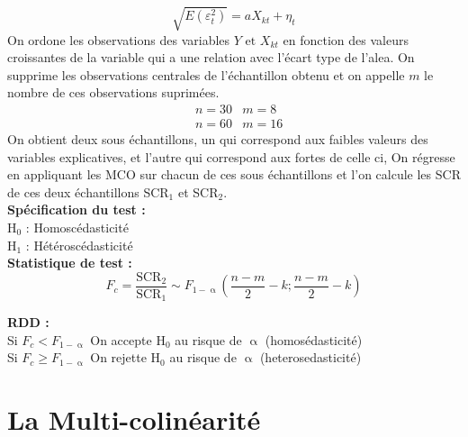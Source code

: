 \documentclass{article}
\begin{document}
\begin{equation*}
    \sqrt{E(\varepsilon_t^2)} = a X_{kt} + \eta_t
\end{equation*}
On ordone les observations des variables $Y \text{ et } X_{kt}$ en fonction des valeurs croissantes de la
variable qui a une relation avec l'écart type de l'alea. On supprime les observations
centrales de l'échantillon obtenu et on appelle $m$ le nombre de ces observations suprimées.
\begin{align*}
    &n =30  &m=8 \\
    &n =60  &m=16
\end{align*}
On obtient deux sous échantillons, un qui correspond aux faibles valeurs des variables
explicatives, et l'autre qui correspond aux fortes de celle ci, On régresse en appliquant les MCO sur chacun
de ces sous échantillons et l'on calcule les SCR de ces deux échantillons SCR$_1$ et SCR$_2$. \\

\textbf{Spécification du test :} \\
H$_0$ : Homoscédasticité \\
H$_1$ : Hétéroscédasticité \\
\textbf{Statistique de test :}
\begin{equation*}
	F_c = \frac{\text{SCR}_2}{\text{SCR}_1} \sim F_{1-\upalpha} \left( \frac{n-m}{2}-k ; \frac{n-m}{2}-k\right)  
\end{equation*}

\textbf{RDD :} \\
Si $F_c < F_{1-\upalpha}$ On accepte H$_0$ au risque de $\upalpha$ (homosédasticité) \\
Si $F_c \ge  F_{1-\upalpha}$ On rejette H$_0$ au risque de $\upalpha$ (heterosedasticité) \\

\section{La Multi-colinéarité}
\end{document}
